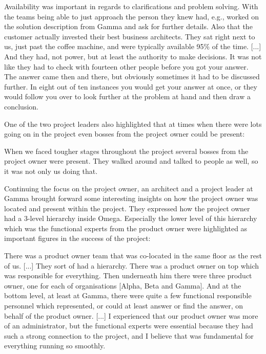 \begin{fancyquotes}
Availability was important in regards to clarifications and problem solving. With the teams being able to just approach the person they knew had, e.g., worked on the solution description from Gamma and ask for further details. Also that the customer actually invested their best business architects. They sat right next to us, just past the coffee machine, and were typically available 95\% of the time. [...] And they had, not power, but at least the authority to make decisions. It was not like they had to check with fourteen other people before you got your answer. The answer came then and there, but obviously sometimes it had to be discussed further. In eight out of ten instances you would get your answer at once, or they would follow you over to look further at the problem at hand and then draw a conclusion.
\end{fancyquotes}

One of the two project leaders also highlighted that at times when there were lots going on in the project even bosses from the project owner could be present:

\begin{fancyquotes}
When we faced tougher stages throughout the project several bosses from the project owner were present. They walked around and talked to people as well, so it was not only us doing that.
\end{fancyquotes}

Continuing the focus on the project owner, an architect and a project leader at Gamma brought forward some interesting insights on how the project owner was located and present within the project. They expressed how the project owner had a 3-level hierarchy inside Omega. Especially the lower level of this hierarchy which was the functional experts from the product owner were highlighted as important figures in the success of the project:

\begin{fancyquotes}
There was a product owner team that was co-located in the same floor as the rest of us. [...] They sort of had a hierarchy. There was a product owner on top which was responsible for everything. Then underneath him there were three product owner, one for each of organisations [Alpha, Beta and Gamma]. And at the bottom level, at least at Gamma, there were quite a few functional responsible personnel which represented, or could at least answer or find the answer, on behalf of the product owner. [...] I experienced that our product owner was more of an administrator, but the functional experts were essential because they had such a strong connection to the project, and I believe that was fundamental for everything running so smoothly.
\end{fancyquotes}

